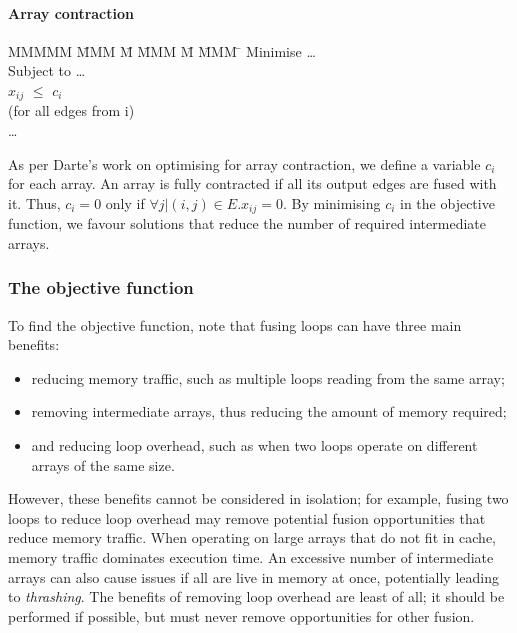 \paragraph{Array contraction}
\begin{tabbing}
MMMMM   \= MMM \= M \= MMM \= M \= MMM \= \kill
Minimise   \> \ldots \\
Subject to \> \ldots \\
           \> $x_{ij}$    \> $\le$ \> $c_i$           \>       \>            \\
           \> (for all edges from i)            \\
           \> \ldots \\
\end{tabbing}
As per Darte's work on optimising for array contraction\cite{darte2002contraction}, we define a variable $c_i$ for each array.
An array is fully contracted if all its output edges are fused with it. Thus, $c_i=0$ only if $\forall j | (i,j) \in E. x_{ij} = 0$. By minimising $c_i$ in the objective function, we favour solutions that reduce the number of required intermediate arrays. 


\subsubsection{The objective function}
\label{s:ObjectiveFunction}

To find the objective function, note that fusing loops can have three main benefits:
\begin{itemize}
\item
reducing memory traffic, such as multiple loops reading from the same array;
\item
removing intermediate arrays, thus reducing the amount of memory required;
\item
and reducing loop overhead, such as when two loops operate on different arrays of the same size.
\end{itemize}
However, these benefits cannot be considered in isolation; for example, fusing two loops to reduce loop overhead may remove potential fusion opportunities that reduce memory traffic.
When operating on large arrays that do not fit in cache, memory traffic dominates execution time.
An excessive number of intermediate arrays can also cause issues if all are live in memory at once, potentially leading to \emph{thrashing}.
The benefits of removing loop overhead are least of all; it should be performed if possible, but must never remove opportunities for other fusion. 

